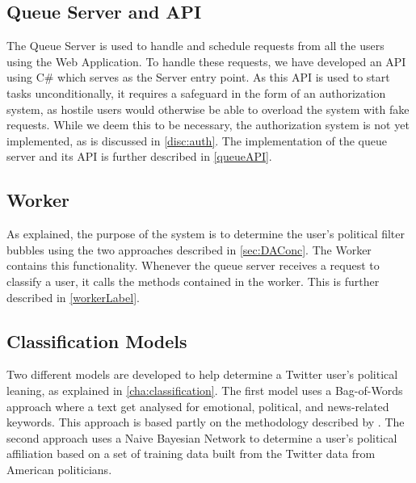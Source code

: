 \subsection{Queue Server and API}
The Queue Server is used to handle and schedule requests from all the users
using the Web Application. To handle these requests, we have developed an API
using C\# which serves as the Server entry point. As this API is used to start
tasks unconditionally, it requires a safeguard in the form of an authorization
system, as hostile users would otherwise be able to overload the system with
fake requests. While we deem this to be necessary, the authorization system is
not yet implemented, as is discussed in \autoref{disc:auth}. The implementation
of the queue server and its API is further described in \autoref{queueAPI}.

\subsection{Worker}
As explained, the purpose of the system is to determine the user's political
filter bubbles using the two approaches described in \autoref{sec:DAConc}. The
Worker contains this functionality. Whenever the queue server receives a request
to classify a user, it calls the methods contained in the worker. This is
further described in \autoref{workerLabel}.

\subsection{Classification Models}
Two different models are developed to help determine a Twitter user's political
leaning, as explained in \autoref{cha:classification}. The first model uses
a Bag-of-Words approach where a text get analysed for emotional, political, and
news-related keywords. This approach is based partly on the methodology
described by . The second approach uses a Naive
Bayesian Network to determine a user's political affiliation based on a set of
training data built from the Twitter data from American politicians.


